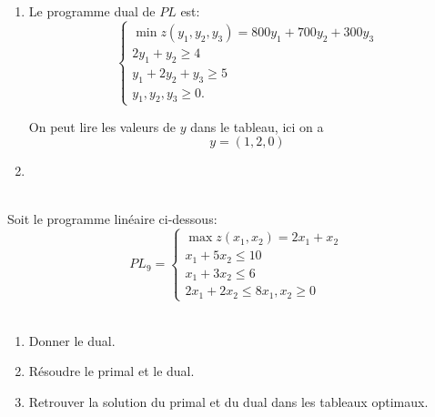 {\begin{td-sol}[]
\begin{enumerate}
			La troisième contrainte
			\begin{equation*}
				x_2 \leq 300
			\end{equation*}
			n'est pas serrée, donc \(y_3 = 0\) (c'est le cas ici).

			\item Le programme dual de \(PL\) est:
			\begin{equation*}
				\begin{cases}
					\min z(y_1,y_2,y_3) = 800y_1 + 700y_2 + 300y_3\\
					2y_1 + y_2 \geq 4\\
					y_1 + 2y_2 + y_3 \geq 5\\
					y_1, y_2, y_3 \geq 0.
				\end{cases}
			\end{equation*}

			On peut lire les valeurs de \(y\) dans le tableau, ici on a
			\begin{equation*}
				y=(1, 2, 0)
			\end{equation*}

			\item \, %
		\end{enumerate}
	\end{td-sol}
}{}


\begin{td-exo}\,\\ %
	Soit le programme linéaire ci-dessous:
	\begin{equation*}
		PL_9 =
		\begin{cases}
			\max z(x_1,x_2) = 2x_1 + x_2\\
			x_1 + 5x_2 \leq 10\\
			x_1 + 3x_2 \leq 6\\
			2x_1 + 2x_2 \leq 8
			x_1,x_2\geq 0
		\end{cases}
	\end{equation*}\,
	\begin{enumerate}
		\item Donner le dual.
		\item Résoudre le primal et le dual.
		\item Retrouver la solution du primal et du dual dans 
		les tableaux optimaux.
	\end{enumerate}
\end{td-exo}

